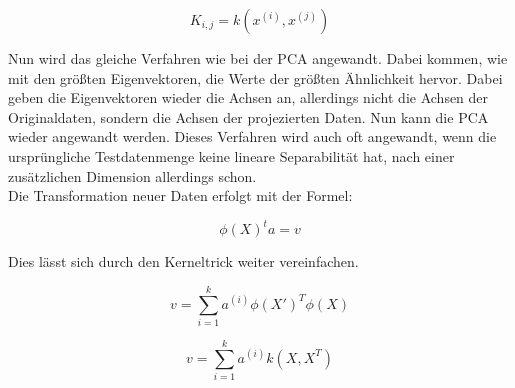 \documentclass[11pt]{article} %
\begin{document}
\begin{equation}
K_{i,j} = k(x^{(i)}, x^{(j)})
\end{equation} 


Nun wird das gleiche Verfahren wie bei der PCA angewandt. Dabei kommen, wie mit den größten Eigenvektoren, die Werte der größten Ähnlichkeit hervor. Dabei geben die Eigenvektoren wieder die Achsen an, allerdings nicht die Achsen der Originaldaten, sondern die Achsen der projezierten Daten. Nun kann die PCA wieder angewandt werden. Dieses Verfahren wird auch oft angewandt, wenn die ursprüngliche Testdatenmenge keine lineare Separabilität hat, nach einer zusätzlichen Dimension allerdings schon.\\
Die Transformation neuer Daten erfolgt mit der Formel:

\begin{equation}
\phi(X)^t a = v
\end{equation}
 
Dies lässt sich durch den Kerneltrick weiter vereinfachen.

\begin{equation}
v = \sum_{i=1}^{k} a^{(i)} \phi(X')^T \phi(X)
\end{equation}

\begin{equation}
v = \sum_{i=1}^{k} a^{(i)} k(X, X^T)
\end{equation}
\end{document}
